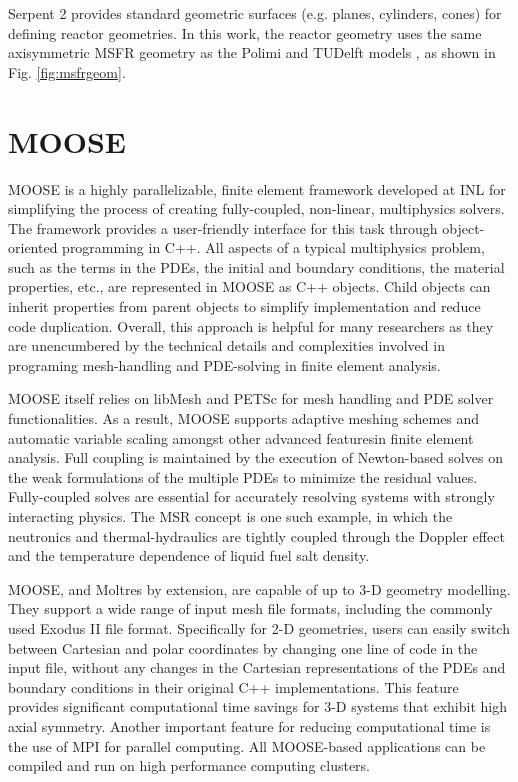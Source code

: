 Serpent 2 provides standard geometric surfaces (e.g. planes, cylinders, cones)
for defining reactor geometries. In this work, the reactor geometry uses the
same axisymmetric \gls{MSFR} geometry as the Polimi and TUDelft models
\cite{fiorina_modelling_2014}, as shown in Fig. \ref{fig:msfrgeom}.

\section{MOOSE}

\gls{MOOSE} \cite{gaston_physics-based_2015} is a highly parallelizable,
finite element framework developed at \gls{INL} for simplifying the process of
creating fully-coupled, non-linear, multiphysics solvers. The framework
provides a user-friendly interface for this task through object-oriented
programming in C++. All aspects of a typical multiphysics problem, such as the
terms in the \glspl{PDE}, the initial and boundary conditions, the material
properties, etc., are represented in \gls{MOOSE} as C++ objects. Child objects
can inherit properties from parent objects to simplify implementation and
reduce code duplication. Overall, this approach
is helpful for many researchers as they are unencumbered by the
technical details and complexities involved in programing mesh-handling
and \gls{PDE}-solving in finite element analysis.

\gls{MOOSE} itself relies on libMesh \cite{kirk_libmesh:_2006} and
PETSc \cite{satish_petsc_2019} for mesh handling and \gls{PDE} solver
functionalities. As a result, \gls{MOOSE} supports adaptive meshing schemes
and automatic variable scaling amongst other advanced featuresin finite
element analysis. Full
coupling is maintained by the execution of Newton-based solves on the
weak formulations of the multiple \glspl{PDE} to minimize the residual values.
Fully-coupled solves are essential for accurately resolving systems with
strongly interacting physics. The \gls{MSR} concept is one such example, in
which the neutronics and thermal-hydraulics are tightly coupled through the
Doppler effect and the temperature dependence of liquid fuel salt density.

\gls{MOOSE}, and Moltres by extension, are capable of up to 3-D geometry
modelling. They support a wide range of input mesh file formats, including the
commonly used Exodus II file format. Specifically for 2-D geometries, users
can easily switch between Cartesian and polar coordinates by changing one line
of code in the input file, without any changes in
the Cartesian representations of the \glspl{PDE} and boundary conditions in
their original C++ implementations. This feature provides significant
computational time savings for 3-D systems that exhibit high axial symmetry.
Another important feature for reducing computational time is the use of MPI
for parallel computing. All \gls{MOOSE}-based applications can be compiled and
run on high performance computing clusters.


